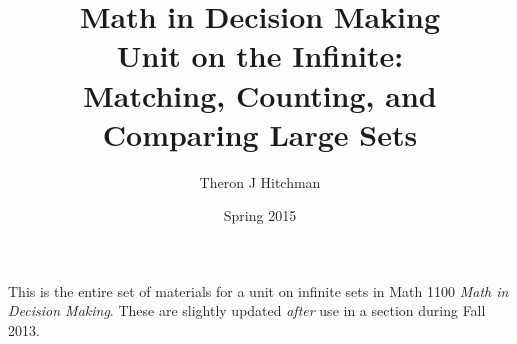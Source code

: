 \documentclass[12pt]{article}
\begin{document}
\title{Math in Decision Making\\ Unit on the Infinite:\\
Matching, Counting, and Comparing Large Sets}
\author{Theron J Hitchman}
\date{Spring 2015}

\maketitle

This is the entire set of materials for a unit on infinite sets in Math 1100 \emph{Math in Decision Making}.
These are slightly updated \emph{after} use in a section during Fall 2013.



%

%


%


%



%


%

%


%



%

%



%



%


%


\end{document}
